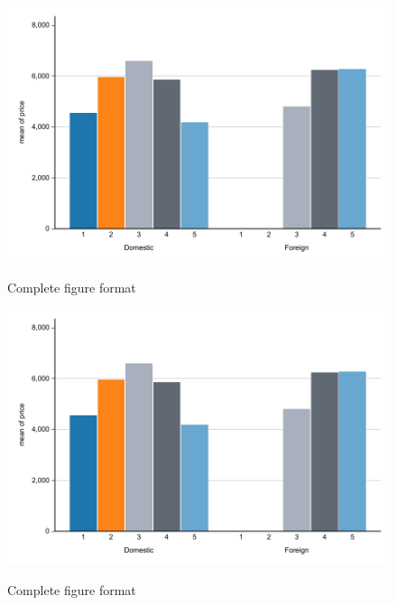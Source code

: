 \documentclass{article}%
\begin{document}

\blindtext

\begin{figure}%
    \caption{Complete figure format}%
    \includegraphics[width=\textwidth]{figure1.pdf}%
    \label{fig:placements_none}%
\end{figure}

\blindtext

\newpage

\blindtext

\begin{figure}[h]%
    \caption{Complete figure format}%
    \includegraphics[width=1\textwidth]{figure1.pdf}%
    \label{fig:placements_h}%
\end{figure}
\end{document}
